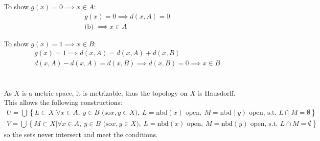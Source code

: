 \documentclass{jhwhw}
\begin{document}
To show $g(x) = 0\implies x\in A $:
\begin{gather}
g(x) = 0 \implies d(x,A)=0\\
\text{(b) }\implies x\in A
\end{gather}

To show $g(x) = 1\implies x\in B $:
\begin{gather}
g(x) = 1 \implies d(x,A)=d(x,A)+d(x,B)\\
d(x,A)-d(x,A)=d(x,B)\implies d(x,B)=0 \implies x\in B
\end{gather}

\part{}%
As $X$ is a metric space, it is metrizable, thus the topology on $X$ is Hausdorff. This allows the following constructions:
\begin{gather}
U=\bigcup\left\{ L\subset X | \forall x\in A,\: y\in B\text{ (so} x,y \in X \text{)}, \: L=\text{nbd}(x) \text{ open}, \: M=\text{nbd}(y) \text{ open, s.t. } L\cap M=\emptyset\right\}\\
V=\bigcup\left\{ M\subset X | \forall x\in A,\: y\in B\text{ (so} x,y \in X \text{)}, \: L=\text{nbd}(x) \text{ open}, \: M=\text{nbd}(y) \text{ open, s.t. } L\cap M=\emptyset\right\}
\end{gather}
so the sets never intersect and meet the conditions.
\end{document}
